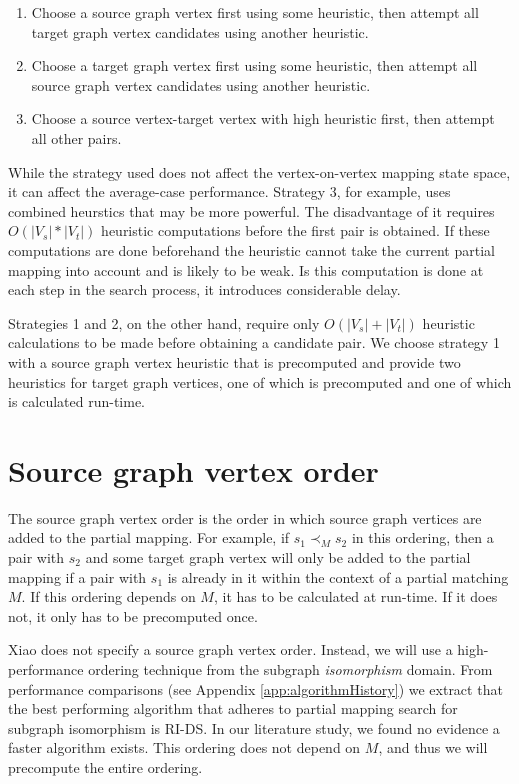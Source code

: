 \begin{enumerate}
\item Choose a source graph vertex first using some heuristic, then attempt all target graph vertex candidates using another heuristic.
\item Choose a target graph vertex first using some heuristic, then attempt all source graph vertex candidates using another heuristic.
\item Choose a source vertex-target vertex with high heuristic first, then attempt all other pairs.
\end{enumerate}

While the strategy used does not affect the vertex-on-vertex mapping state space, it can affect the average-case performance. Strategy 3, for example, uses combined heurstics that may be more powerful. The disadvantage of it requires $O(|V_s|*|V_t|)$ heuristic computations before the first pair is obtained. If these computations are done beforehand the heuristic cannot take the current partial mapping into account and is likely to be weak. Is this computation is done at each step in the search process, it introduces considerable delay.

Strategies 1 and 2, on the other hand, require only $O(|V_s|+|V_t|)$ heuristic calculations to be made before obtaining a candidate pair. We choose strategy 1 with a source graph vertex heuristic that is precomputed and provide two heuristics for target graph vertices, one of which is precomputed and one of which is calculated run-time.

\section{Source graph vertex order}
\label{sec:sourceOrder}
The source graph vertex order is the order in which source graph vertices are added to the partial mapping. For example, if $s_1 \prec_M s_2$ in this ordering, then a pair with $s_2$ and some target graph vertex will only be added to the partial mapping if a pair with $s_1$ is already in it within the context of a partial matching $M$. If this ordering depends on $M$, it has to be calculated at run-time. If it does not, it only has to be precomputed once.

Xiao does not specify a source graph vertex order. Instead, we will use a high-performance ordering technique from the subgraph \textit{isomorphism} domain. From performance comparisons (see Appendix \ref{app:algorithmHistory}) we extract that the best performing algorithm that adheres to partial mapping search for subgraph isomorphism is RI-DS. In our literature study, we found no evidence a faster algorithm exists. This ordering does not depend on $M$, and thus we will precompute the entire ordering.

